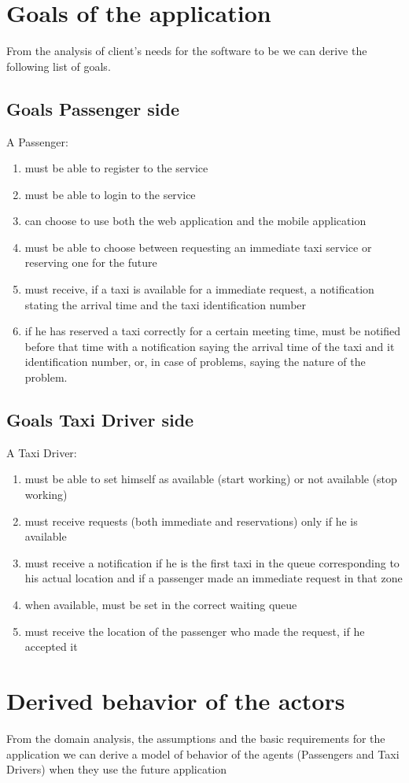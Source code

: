 \section{Goals of the application}
From the analysis of client's needs for the software to be we can derive the following list of goals.
\subsection{Goals Passenger side}
A Passenger:
\begin{enumerate}
\item must be able to register to the service
\item must be able to login to the service
\item can choose to use both the web application and the mobile application
\item  must be able to choose between requesting an immediate taxi service or reserving one for the future
\item must receive, if a taxi is available for a immediate request, a notification stating the arrival time and the taxi identification number
\item if he has reserved a taxi correctly for a certain meeting time, must be notified before that time with a notification saying the arrival time of the taxi and it identification number, or, in case of problems, saying the nature of the problem.
\end{enumerate}
\subsection{Goals Taxi Driver side}
A Taxi Driver:
\begin{enumerate}
\item must be able to set himself as available (start working) or not available (stop working)
\item must receive requests (both immediate and reservations) only if he is available 
\item must receive a notification if he is the first taxi in the queue corresponding to his actual location and if a passenger made an immediate request in that zone
\item when available, must be set in the correct waiting queue
\item must receive the location of the passenger who made the request, if he accepted it
\end{enumerate}

\section{Derived behavior of the actors}
From the domain analysis, the assumptions and the basic requirements for the application we can derive a model of behavior of the agents (Passengers and Taxi Drivers) when they use the future application
